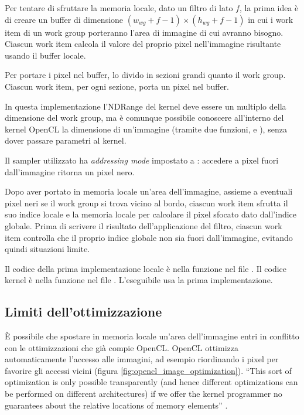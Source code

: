 \documentclass[10pt]{myarticle}
\begin{document}
Per tentare di sfruttare la memoria locale, dato un filtro di lato $f$, la prima idea \`e di creare un buffer di dimensione $(w_{wg} + f - 1) \times (h_{wg} + f - 1)$ in cui i work item di un work group porteranno l'area di immagine di cui avranno bisogno.
Ciascun work item calcola il valore del proprio pixel nell'immagine risultante usando il buffer locale.

Per portare i pixel nel buffer, lo divido in sezioni grandi quanto il work group.
Ciascun work item, per ogni sezione, porta un pixel nel buffer.

In questa implementazione l'NDRange del kernel deve essere un multiplo della dimensione del work group, ma \`e comunque possibile conoscere all'interno del kernel OpenCL la dimensione di un'immagine (tramite due funzioni,  e ), senza dover passare parametri al kernel.

Il sampler utilizzato ha \emph{addressing mode} impostato a : accedere a pixel fuori dall'immagine ritorna un pixel nero.

Dopo aver portato in memoria locale un'area dell'immagine, assieme a eventuali pixel neri se il work group si trova vicino al bordo, ciascun work item sfrutta il suo indice locale e la memoria locale per calcolare il pixel sfocato dato dall'indice globale.
Prima di scrivere il risultato dell'applicazione del filtro, ciascun work item controlla che il proprio indice globale non sia fuori dall'immagine, evitando quindi situazioni limite.

Il codice della prima implementazione locale \`e nella funzione  nel file .
Il codice kernel \`e nella funzione  nel file .
L'eseguibile  usa la prima implementazione.

\subsection{Limiti dell'ottimizzazione}

\`E possibile che spostare in memoria locale un'area dell'immagine entri in conflitto con le ottimizzazioni che gi\`a compie OpenCL.
OpenCL ottimizza automaticamente l'accesso alle immagini, ad esempio riordinando i pixel per favorire gli accessi vicini (figura \ref{fig:opencl_image_optimization}).
``This sort of optimization is only possible transparently (and hence different optimizations can be performed on different architectures) if we offer the kernel programmer no guarantees about the relative locations of memory elements'' \cite[p.~114]{hetcomp}.
\end{document}
